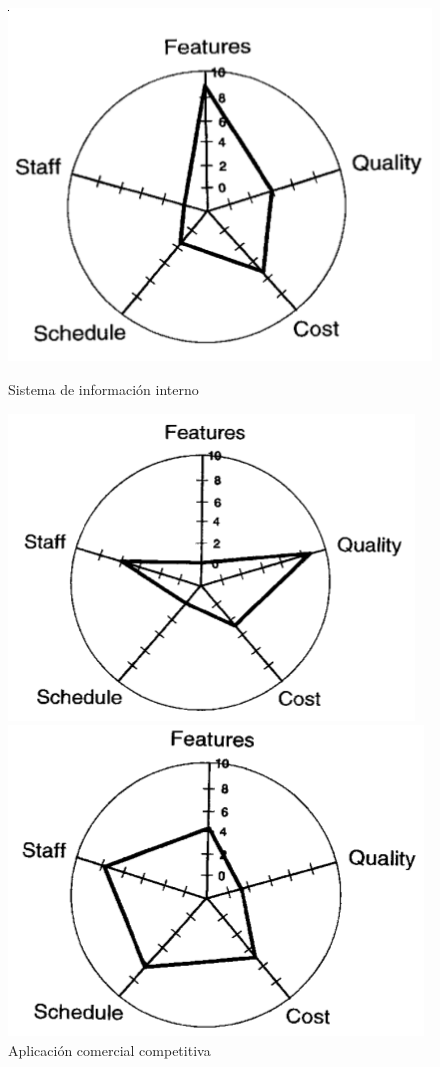 \documentclass[]{article}
\begin{document}
\begin{figure}[!htb]
  \includegraphics[width=\linewidth]{images/17_ej1_infoInterno.png}
  \caption{Sistema de información interno}
\endminipage\hfill
{}
  \includegraphics[width=\linewidth]{images/17_ej2_appComercial.png}
  \caption{Aplicación comercial competitiva}
\endminipage\hfill
{}%
  \includegraphics[width=\linewidth]{images/17_ej3_qualityDriven.png}

\end{figure}
\end{document}
